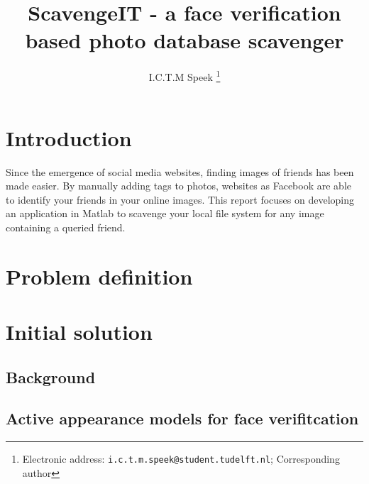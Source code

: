 \documentclass[10pt,a4paper,twocolumn]{article}
\title{ScavengeIT - a face verification based photo database scavenger}
\author{I.C.T.M Speek%
		\thanks{Electronic address: \texttt{i.c.t.m.speek@student.tudelft.nl}; Corresponding author}}
\affil{Computer Vision \\ Delft University of Technology}
\begin{document}
\maketitle



\begin{abstract}


\end{abstract}


\section{Introduction}

Since the emergence of social media websites, finding images of friends has been made easier. By manually adding tags to photos, websites as Facebook are able to identify your friends in your online images. This report focuses on developing an application in Matlab to scavenge your local file system for any image containing a queried friend. 



\section{Problem definition}




\section{Initial solution}

\subsection{Background}

\subsection{Active appearance models for face verifitcation}


\end{document}
